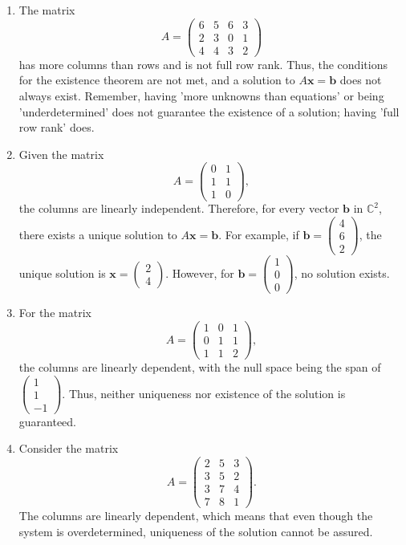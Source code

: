 \begin{enumerate}
    \item The matrix
    \[
    A = \begin{pmatrix}
    6 & 5 & 6 & 3 \\
    2 & 3 & 0 & 1 \\
    4 & 4 & 3 & 2
    \end{pmatrix}
    \]
    has more columns than rows and is not full row rank. Thus, the conditions for the existence theorem are not met, and a solution to \( A\mathbf{x} = \mathbf{b} \) does not always exist. Remember, having 'more unknowns than equations' or being 'underdetermined' does not guarantee the existence of a solution; having 'full row rank' does.
    \item Given the matrix 
\[ A = \begin{pmatrix} 0 & 1 \\ 1 & 1 \\ 1 & 0 \end{pmatrix}, \]
the columns are linearly independent. Therefore, for every vector \( \mathbf{b} \) in \( \mathbb{C}^2 \), there exists a unique solution to \( A\mathbf{x} = \mathbf{b} \). For example, if \( \mathbf{b} = \begin{pmatrix} 4 \\ 6 \\ 2 \end{pmatrix} \), the unique solution is \( \mathbf{x} = \begin{pmatrix} 2 \\ 4 \end{pmatrix} \). However, for \( \mathbf{b} = \begin{pmatrix} 1 \\ 0 \\ 0 \end{pmatrix} \), no solution exists.
    \item For the matrix 
\[ A = \begin{pmatrix} 1 & 0 & 1 \\ 0 & 1 & 1 \\ 1 & 1 & 2 \end{pmatrix}, \]
the columns are linearly dependent, with the null space being the span of \( \begin{pmatrix} 1 \\ 1 \\ -1 \end{pmatrix} \). Thus, neither uniqueness nor existence of the solution is guaranteed.
    \item Consider the matrix 
\[ A = \begin{pmatrix} 2 & 5 & 3 \\ 3 & 5 & 2 \\ 3 & 7 & 4 \\ 7 & 8 & 1 \end{pmatrix}. \]
The columns are linearly dependent, which means that even though the system is overdetermined, uniqueness of the solution cannot be assured.

\end{enumerate}

